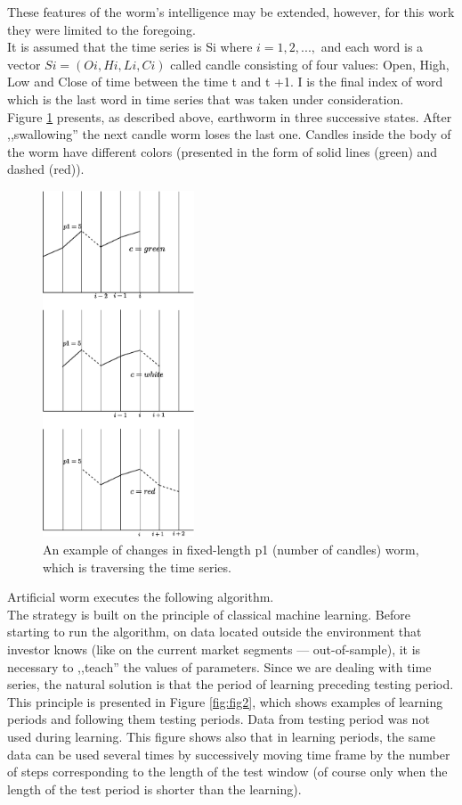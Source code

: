 \documentclass[runningheads,a4paper]{llncs}
\begin{document}
These features of the worm's intelligence may be extended, however, for this work they were limited to the foregoing. \\

It is assumed that the time series is Si where $i = 1, 2, ...,$ and each word is a vector $Si = (Oi, Hi, Li, Ci)$ called candle consisting of  four values: Open, High, Low and Close of time between the time t and t +1. I is the final index of word which is the last word in time series that was taken under consideration.\\

Figure \ref{fig:fig1} presents, as described above, earthworm in three successive states. After ,,swallowing'' the next candle worm loses the last one. Candles inside the body of the worm have different colors (presented in the form of solid lines (green) and dashed (red)). 
\begin{figure}[ht]
\centering
\includegraphics[width = 0.4\textwidth]{figures/rys1.eps}
\caption{An example of changes in fixed-length p1 (number of candles) worm, which is traversing the time series.}
\label{fig:fig1}
\end{figure}
\FloatBarrier
Artificial worm executes the following algorithm.\\
The strategy is built on the principle of classical machine learning. Before starting to run the algorithm, on data located outside the environment that investor knows (like on the current market segments --- out-of-sample), it is necessary to ,,teach''  the values of parameters. Since we are dealing with time series,  the natural solution is that the period of learning preceding testing period.  This principle is presented in Figure \ref{fig:fig2}, which shows examples of learning periods and following them testing periods. Data from testing period was not used during learning. This figure shows also that in learning periods, the same data can be used several times by successively moving time frame by the number of steps corresponding to the length of the test window (of course only when  the length of the test period is shorter than the learning).\\
\end{document}
